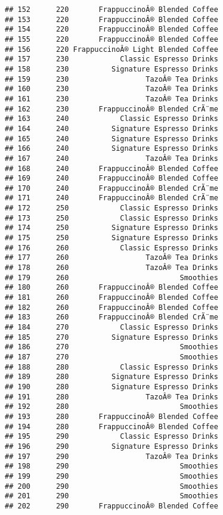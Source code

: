 \documentclass[
]{article}
\begin{document}
\begin{verbatim}
## 152      220       FrappuccinoÂ® Blended Coffee
## 153      220       FrappuccinoÂ® Blended Coffee
## 154      220       FrappuccinoÂ® Blended Coffee
## 155      220       FrappuccinoÂ® Blended Coffee
## 156      220 FrappuccinoÂ® Light Blended Coffee
## 157      230            Classic Espresso Drinks
## 158      230          Signature Espresso Drinks
## 159      230                  TazoÂ® Tea Drinks
## 160      230                  TazoÂ® Tea Drinks
## 161      230                  TazoÂ® Tea Drinks
## 162      230       FrappuccinoÂ® Blended CrÃ¨me
## 163      240            Classic Espresso Drinks
## 164      240          Signature Espresso Drinks
## 165      240          Signature Espresso Drinks
## 166      240          Signature Espresso Drinks
## 167      240                  TazoÂ® Tea Drinks
## 168      240       FrappuccinoÂ® Blended Coffee
## 169      240       FrappuccinoÂ® Blended Coffee
## 170      240       FrappuccinoÂ® Blended CrÃ¨me
## 171      240       FrappuccinoÂ® Blended CrÃ¨me
## 172      250            Classic Espresso Drinks
## 173      250            Classic Espresso Drinks
## 174      250          Signature Espresso Drinks
## 175      250          Signature Espresso Drinks
## 176      260            Classic Espresso Drinks
## 177      260                  TazoÂ® Tea Drinks
## 178      260                  TazoÂ® Tea Drinks
## 179      260                          Smoothies
## 180      260       FrappuccinoÂ® Blended Coffee
## 181      260       FrappuccinoÂ® Blended Coffee
## 182      260       FrappuccinoÂ® Blended Coffee
## 183      260       FrappuccinoÂ® Blended CrÃ¨me
## 184      270            Classic Espresso Drinks
## 185      270          Signature Espresso Drinks
## 186      270                          Smoothies
## 187      270                          Smoothies
## 188      280            Classic Espresso Drinks
## 189      280          Signature Espresso Drinks
## 190      280          Signature Espresso Drinks
## 191      280                  TazoÂ® Tea Drinks
## 192      280                          Smoothies
## 193      280       FrappuccinoÂ® Blended Coffee
## 194      280       FrappuccinoÂ® Blended Coffee
## 195      290            Classic Espresso Drinks
## 196      290          Signature Espresso Drinks
## 197      290                  TazoÂ® Tea Drinks
## 198      290                          Smoothies
## 199      290                          Smoothies
## 200      290                          Smoothies
## 201      290                          Smoothies
## 202      290       FrappuccinoÂ® Blended Coffee

\end{verbatim}
\end{document}
